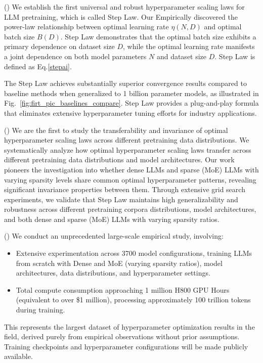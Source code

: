 \documentclass[11pt]{article}
\newcommand{\rmnum}[1]{\romannumeral #1}
\begin{document}
    (\rmnum{2}) We establish the first universal and robust hyperparameter
    scaling laws for LLM pretraining, which is called Step Law. Our Empirically discovered the power-law
    relationship between optimal learning rate $\eta(N, D)$ and optimal batch
    size $B(D)$. Step Law demonstrates that the optimal batch size exhibits a primary dependence on dataset size $D$, while the optimal learning rate manifests a joint dependence on both model parameters $N$ and dataset size $D$. 
    Step Law is defined as Eq.\eqref{stepai}.
    
   
    The Step Law achieves substantially superior convergence results compared
    to baseline methods when generalized to 1 billion parameter models, as
    illustrated in Fig.~\ref{fig:firt_pic_baselines_compare}.
    Step Law provides a plug-and-play formula that eliminates extensive hyperparameter tuning efforts for industry applications.
    
    
    (\rmnum{3}) 
    We are the first to study the transferability and invariance of optimal hyperparameter scaling laws across different pretraining data distributions. We systematically analyze how optimal hyperparameter scaling laws transfer across different pretraining data distributions and model architectures. Our work pioneers the investigation into whether dense LLMs and sparse (MoE) LLMs with varying sparsity levels share common optimal hyperparameter patterns, revealing significant invariance properties between them. Through extensive grid search experiments, we validate that Step Law maintains high generalizability and robustness across different pretraining corpora distributions, model architectures, and both dense and sparse (MoE) LLMs with varying sparsity ratios.
    
    (\rmnum{4}) We conduct an unprecedented large-scale empirical study, involving:
    \begin{itemize}
        \item Extensive experimentation across 3700 model configurations, training LLMs from scratch with Dense and MoE (varying sparsity ratios), model architectures, data distributions, and hyperparameter settings.
        \item Total compute consumption approaching 1 million H800 GPU Hours (equivalent to over \$1 million), processing approximately 100 trillion tokens during training.
    \end{itemize}
    This represents the largest dataset of hyperparameter optimization results
    in the field, derived purely from empirical observations without prior assumptions.
    Training checkpoints and hyperparameter configurations will be made publicly available.
\end{document}
